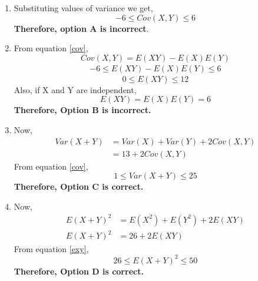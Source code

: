 \documentclass[journal,12pt,twocolumn]{IEEEtran}
\begin{document}
\begin{enumerate}
\item
Substituting values of variance we get,
\begin{equation}\label{cov}
    -6\leq{Cov(X,Y)}\leq 6
\end{equation}
\textbf{Therefore, option A is incorrect}.\\
\item
From equation \eqref{cov},
\begin{equation}
    {Cov(X,Y)}=E(XY)-E(X)E(Y)
\end{equation}
\begin{align}
    -6\leq E(XY)-E(X)E(Y)\leq 6
\end{align}
\begin{equation}\label{exy}
    0\leq E(XY)\leq12
\end{equation}
Also, if X and Y are independent,
\begin{equation}
    E(XY)=E(X)E(Y)=6
\end{equation}
\textbf{Therefore, Option B is incorrect.}\\
\item
Now,
\begin{align}
    Var(X+Y)&=Var(X)+Var(Y)+2Cov(X,Y)\\
    &=13+2Cov(X,Y)
\end{align}
From equation \eqref{cov},
\begin{equation}
    1\leq Var(X+Y)\leq 25
\end{equation}
\textbf{Therefore, Option C is correct.}\\
\item
Now,
\begin{align}
    E(X+Y)^2 &= E(X^2)+E(Y^2)+2E(XY)\\
    E(X+Y)^2 &= 26+2E(XY)
\end{align}
From equation \eqref{exy},
\begin{equation}
    26\leq E(X+Y)^2\leq50
\end{equation}
\textbf{Therefore, Option D is correct.}\\
\end{enumerate}
\end{document}
